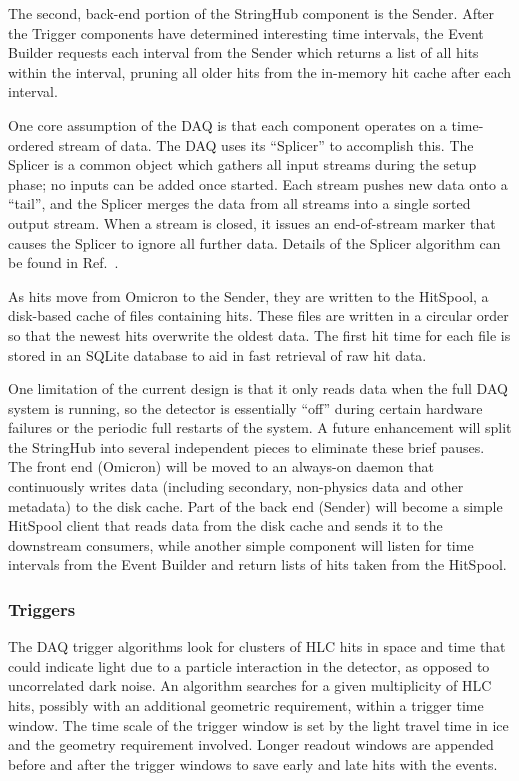 The second, back-end portion of the StringHub component is the Sender.  After the
Trigger components have determined interesting time intervals, 
the Event Builder requests each interval from the Sender which returns a list of
all hits within the interval, pruning all older hits from the in-memory hit
cache after each interval.

One core assumption of the DAQ is that each component operates on a
time-ordered stream of data.  The DAQ uses its ``Splicer'' to accomplish
this.  The Splicer is a common object which gathers all input streams
during the setup phase; no inputs can be added once started.  Each stream
pushes new data onto a ``tail'', and the Splicer merges the data from all
streams into a single sorted output stream.  When a stream is closed, it
issues an end-of-stream marker that causes the Splicer to
ignore all further data.  Details of the Splicer algorithm can be found in
Ref.~\cite{vlvnt13_trigger}.  

As hits move from Omicron to the Sender, they are written to the
HitSpool, a disk-based cache of files containing hits.  These files are
written in a circular order so that the newest hits overwrite the oldest
data.  The first hit time for each file is stored in an SQLite database to
aid in fast retrieval of raw hit data.

One limitation of the current design is that it only reads data when
the full DAQ system is running, so the detector is essentially ``off''
during certain hardware failures or the periodic full restarts of the system.
A future enhancement 
will split the StringHub into several independent pieces to eliminate these
brief pauses.  The front end (Omicron) will be moved to an always-on daemon
that continuously writes data (including secondary, non-physics data and
other metadata) to the disk cache.  Part of the back end (Sender) 
will become a simple HitSpool client that reads data from the disk cache
and sends it to the downstream consumers, while another simple component
will listen for time intervals from the Event Builder and return lists of
hits taken from the HitSpool.

\subsubsection{\label{sect:online:trigger}Triggers}

The DAQ trigger algorithms look for clusters of HLC hits in space and time
that could indicate light due to a particle interaction in the detector, as
opposed to uncorrelated dark noise.   An algorithm searches for a given
multiplicity of HLC hits, possibly with an additional geometric
requirement, within a trigger time window.  The time scale of the trigger window is
set by the light travel time in ice and the geometry requirement
involved. Longer readout windows are appended before and after the trigger
windows to save early and late hits with the events.

